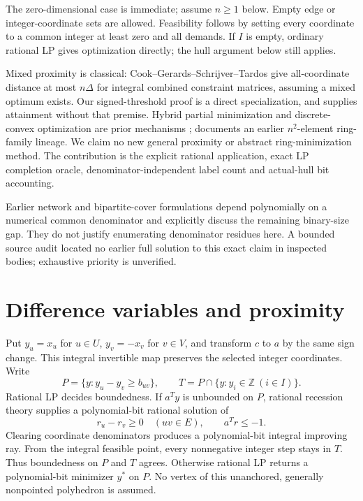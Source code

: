\documentclass[11pt]{article}
\newcommand{\Z}{\mathbb Z}
\begin{document}
The zero-dimensional case is immediate; assume $n\ge1$ below. Empty edge or
integer-coordinate sets are allowed. Feasibility follows by setting every
coordinate to a common integer at least zero and all demands. If $I$ is empty,
ordinary rational LP gives optimization directly; the hull argument below
still applies.

Mixed proximity is classical: Cook--Gerards--Schrijver--Tardos
\cite[p.~258, Remarks~(1)]{CGST} give all-coordinate distance at most $n\Delta$
for integral combined constraint matrices, assuming a mixed optimum exists.
Our signed-threshold proof is a direct specialization, and supplies attainment
without that premise. Hybrid partial minimization and discrete-convex
optimization are prior mechanisms \cite[Proposition~2]{THM};
\cite[\S4.1]{Murota} documents an earlier $n^2$-element ring-family lineage.
We claim no new general proximity or abstract ring-minimization method.
The contribution is the explicit rational application, exact LP completion
oracle, denominator-independent label count and actual-hull bit accounting.

Earlier network and bipartite-cover formulations \cite{Network,Covers}
depend polynomially on a numerical common denominator and explicitly discuss
the remaining binary-size gap. They do not justify enumerating denominator
residues here. A bounded source audit located no earlier full solution to
this exact claim in inspected bodies; exhaustive priority is unverified.

\section{Difference variables and proximity}
Put $y_u=x_u$ for $u\in U$, $y_v=-x_v$ for $v\in V$, and transform $c$ to $a$
by the same sign change. This integral invertible map preserves the selected
integer coordinates. Write
\[
 P=\{y:y_u-y_v\ge b_{uv}\},\qquad
 T=P\cap\{y:y_i\in\Z\ (i\in I)\}.
\]
Rational LP decides boundedness. If $a^Ty$ is unbounded on $P$, rational
recession theory supplies a polynomial-bit rational solution of
\[
 r_u-r_v\ge0\quad(uv\in E),\qquad a^Tr\le-1.
\]
Clearing coordinate denominators produces a polynomial-bit integral improving
ray. From the integral feasible point, every nonnegative integer step stays
in $T$. Thus boundedness on $P$ and $T$ agrees. Otherwise rational LP returns
a polynomial-bit minimizer $y^*$ on $P$. No vertex of this unanchored,
generally nonpointed polyhedron is assumed.
\end{document}
